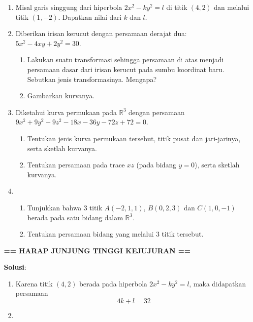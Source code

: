 \documentclass[10pt,openany,a4paper]{article}
\newcommand{\jawab}{\textbf{Solusi}:}
\begin{document}
\begin{enumerate}
    \item Misal garis singgung dari hiperbola \(2x^2 - ky^2 = l\) di titik \((4, 2)\) dan melalui titik \((1, -2)\). Dapatkan nilai dari \(k\) dan \(l\).
    
    \item Diberikan irisan kerucut dengan persamaan derajat dua: \(5x^2 - 4xy + 2y^2 = 30\).
    \begin{enumerate}
        \item Lakukan suatu transformasi sehingga persamaan di atas menjadi persamaan dasar dari irisan kerucut pada sumbu koordinat baru. Sebutkan jenis transformasinya. Mengapa?
        \item Gambarkan kurvanya.
    \end{enumerate}
    
    \item Diketahui kurva permukaan pada \(\mathbb{R}^3\) dengan persamaan \(9x^2 + 9y^2 + 9z^2 - 18x - 36y - 72z + 72 = 0\).
    \begin{enumerate}
        \item Tentukan jenis kurva permukaan tersebut, titik pusat dan jari-jarinya, serta sketlah kurvanya.
        \item Tentukan persamaan pada trace \(xz\) (pada bidang \(y=0\)), serta sketlah kurvanya.
    \end{enumerate}
    
    \item 
    \begin{enumerate}
        \item Tunjukkan bahwa 3 titik \(A(-2,1,1)\), \(B(0,2,3)\) dan \(C(1,0,-1)\) berada pada satu bidang dalam \(\mathbb{R}^3\).
        \item Tentukan persamaan bidang yang melalui 3 titik tersebut.
    \end{enumerate}
\end{enumerate}
\begin{center}
    
\end{center}
\begin{center}
    
\end{center}
\begin{center}
    
\end{center}
\begin{center}
    
\end{center}
\begin{center}
    \textbf{== HARAP JUNJUNG TINGGI KEJUJURAN ==}
\end{center}
\newpage
\jawab
\begin{enumerate}
    \item Karena titik $(4,2)$ berada pada hiperbola $2x^2 - ky^2 = l$, maka didapatkan persamaan
    \begin{equation}
         4k + l = 32 \label{eq1}
    \end{equation}
    \item 
\end{enumerate}
\end{document}
